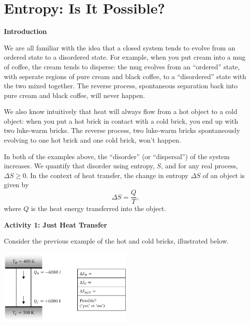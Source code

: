 \section{Entropy: Is It Possible?}

\makelabheader %

\vspace{0.2in}
\textbf{Introduction} 

We are all familiar with the idea that a closed system tends to evolve from an ordered state to a disordered state.  For example, when you put cream into a mug of coffee, the cream tends to disperse: the mug evolves from an ``ordered'' state, with seperate regions of pure cream and black coffee, to a ``disordered'' state with the two mixed together.  The reverse process, spontaneous separation back into pure cream and black coffee, will never happen.

We also know intuitively that heat will always flow from a hot object to a cold object: when you put a hot brick in contact with a cold brick, you end up with two luke-warm bricks.  The reverse process, two luke-warm bricks spontaneously evolving to one hot brick and one cold brick, won't happen.  

In both of the examples above, the ``disorder'' (or ``dispersal'') of the system increases.  We quantify that disorder using entropy, $S$, and for any real process, $\Delta S \geq 0$.  In the context of heat transfer, the change in entropy $\Delta S$ of an object is given by 
\begin{displaymath}
\Delta S = \frac{Q}{T},
\end{displaymath}
where $Q$ is the heat energy transferred into the object.  

\vspace{0.3 in}
\textbf{Activity 1: Just Heat Transfer}

Consider the previous example of the hot and cold bricks, illustrated below.

\begin{center}
\vspace{-0.3 in}
\includegraphics[width=0.5\textwidth]{entropy_is_it_possible/fig1.eps}
\vspace{-0.3 in}
\end{center}

